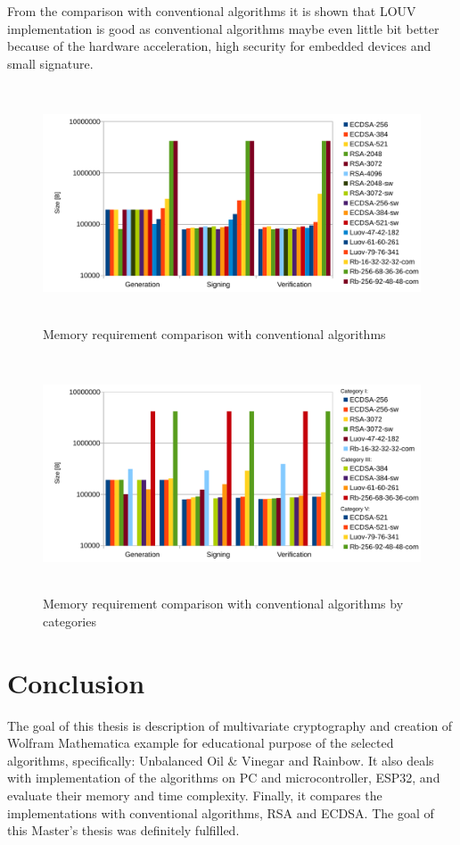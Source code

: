 \documentclass[thesis=M,english]{FITthesis}[2019/12/23]
\begin{document}
\bigskip
\noindent
From the comparison with conventional algorithms it is shown that LOUV implementation is good as conventional algorithms maybe even little bit better because of the hardware acceleration, high security for embedded devices and small signature.

\begin{figure}[H]
\centering
\includegraphics[width=13cm,height=7cm]{images/mem-all.pdf}
\caption{Memory requirement comparison with conventional algorithms}
\label{mem-all}
\end{figure}

\bigskip\bigskip\bigskip
\begin{figure}[H]
\centering
\includegraphics[width=13cm,height=7cm]{images/mem-category-all.pdf}
\caption{Memory requirement comparison with conventional algorithms by categories}
\label{mem-category-all}
\end{figure}

\chapter{Conclusion}
The goal of this thesis is description of multivariate cryptography and creation of Wolfram Mathematica example for educational purpose of the selected algorithms, specifically: Unbalanced Oil \& Vinegar and Rainbow. It also deals with implementation of the algorithms on PC and microcontroller, ESP32, and evaluate their memory and time complexity. Finally, it compares the implementations with conventional algorithms, RSA and ECDSA. The goal of this Master's thesis was definitely fulfilled.
\end{document}
